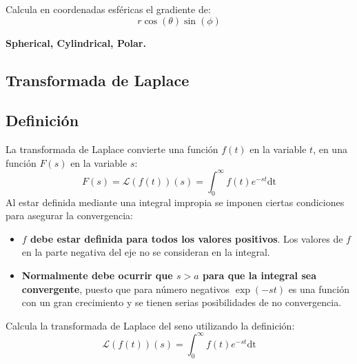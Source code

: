 \documentclass[a4paper,10pt, draft]{article}
\newenvironment{capitulo}{\begin{tcolorbox}[colback=red!5!white,colframe=red!75!black]}{\end{tcolorbox}\bigskip}
\newenvironment{ejer}{\begin{tcolorbox}[center title, title=Ejercicios,
fonttitle=\sffamily\bfseries,colback=blue!5,colframe=orange]}{\end{tcolorbox}}
\newenvironment{funciones}{\begin{tcolorbox}[center title, title=Nuevas funciones, fonttitle=\sffamily\bfseries, colback=green!5!white,colframe=red!75!black]}{\end{tcolorbox}\bigskip}
\begin{document}
\begin{ejer}

Calcula en coordenadas esféricas el gradiente de:
\[
r\cos(\theta)\sin(\phi)
\]

\end{ejer} 

\begin{funciones}

\textbf{Spherical, Cylindrical, Polar.}

\end{funciones}



 \newpage





\newpage

\begin{capitulo}

\section{Transformada de Laplace}

\end{capitulo}


\subsection{Definición}

La transformada de Laplace convierte una función $f(t)$ en la variable $t$, en una función $F(s)$ en la variable $s$:
\[
F(s)=\mathscr{L}(f(t)) (s)= \int_0^\infty  f(t) e^{-st} \mathrm{dt}
\]
Al estar definida mediante una integral impropia se imponen ciertas condiciones para asegurar la convergencia: 

\begin{itemize}

\item  \textbf{$f$ debe estar definida para todos los valores positivos}. Los valores de $f$ en la parte negativa del eje no se consideran en la integral.

\item \textbf{Normalmente debe ocurrir que $s>a$ para que la integral sea convergente}, puesto que para número negativos $\exp(-st)$ es una función con un gran crecimiento y se tienen serias posibilidades de no convergencia.

\end{itemize}



\begin{ejer}

Calcula la transformada de Laplace del seno utilizando la definición:
\[
\mathscr{L}(f(t)) (s)= \int_0^\infty  f(t) e^{-st} \mathrm{dt}
\]

\end{ejer}  
\end{document}
